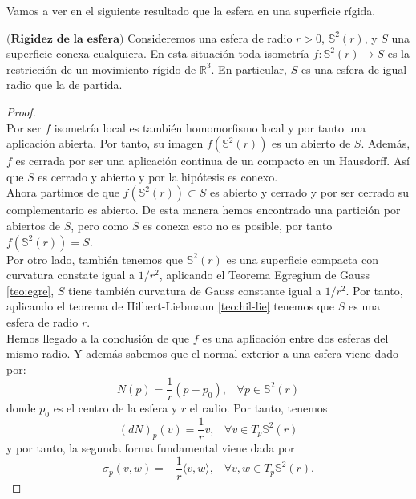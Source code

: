 ${ }$\\

Vamos a ver en el siguiente resultado que la esfera en una superficie rígida.
${ }$\\

\begin{teorema}
	$\textbf{(Rigidez de la esfera)}$ Consideremos una esfera de radio $r>0$, $\mathbb{S}^2(r)$, y $S$ una superficie conexa cualquiera. En esta situación toda isometría $f : \mathbb{S}^2(r) \to S$ es la restricción de un movimiento rígido de $\mathbb{R}^3$. En particular, $S$ es una esfera de igual radio que la de partida.
\end{teorema}

\begin{proof}
	${ }$\\
	
	Por ser $f$ isometría local es también homomorfismo local y por tanto una aplicación abierta. Por tanto, su imagen $f(\mathbb{S}^2(r))$ es un abierto de $S$. Además, $f$ es cerrada por ser una aplicación continua de un compacto en un Hausdorff. Así que $S$ es cerrado y abierto y por la hipótesis es conexo.
		${ }$\\
		
	Ahora partimos de que $f(\mathbb{S}^2(r)) \subset S$ es abierto y cerrado y por ser cerrado su complementario es abierto. De esta manera hemos encontrado una partición por abiertos de $S$, pero como $S$ es conexa esto no es posible, por tanto $f(\mathbb{S}^2(r)) = S$.
		${ }$\\
		
	Por otro lado, también tenemos que $\mathbb{S}^2(r)$ es una superficie compacta con curvatura constate igual a $1 / r^2$, aplicando el Teorema Egregium de Gauss \ref{teo:egre}, $S$ tiene también curvatura de Gauss constante igual a $1 / r^2$. Por tanto, aplicando el teorema de Hilbert-Liebmann \ref{teo:hil-lie} tenemos que $S$ es una esfera de radio $r$.
		${ }$\\
		
	Hemos llegado a la conclusión de que $f$ es una aplicación entre dos esferas del mismo radio. Y además sabemos que el normal exterior a una esfera viene dado por:
	${ }$\\
	\[
		N(p) = \frac{1}{r} (p - p_0),  \;\;\;  \forall p \in \mathbb{S}^2(r)
	\]
	${ }$\\
	donde $p_0$ es el centro de la esfera y $r$ el radio. Por tanto, tenemos
	${ }$\\
	\[
		(dN)_p (v) = \frac{1}{r} v,  \;\;\;  \forall v \in T_p \mathbb{S}^2(r)
	\]
	${ }$\\
	y por tanto, la segunda forma fundamental viene dada por
	${ }$\\
	\[
		\sigma_p (v, w) = - \frac{1}{r} \langle v, w \rangle,  \;\;\;  \forall v, w \in T_p \mathbb{S}^2(r).
	\]
	${ }$\\
	

\end{proof}
